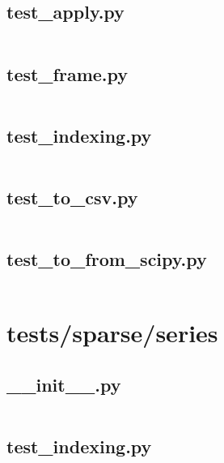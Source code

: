 \documentclass{article}
\begin{document}
\subsection{test\_apply.py}
\inputminted{python}{/home/dufferzafar/dev/@clones/pandas/pandas/tests/sparse/frame/test_apply.py}
\newpage

\subsection{test\_frame.py}
\inputminted{python}{/home/dufferzafar/dev/@clones/pandas/pandas/tests/sparse/frame/test_frame.py}
\newpage

\subsection{test\_indexing.py}
\inputminted{python}{/home/dufferzafar/dev/@clones/pandas/pandas/tests/sparse/frame/test_indexing.py}
\newpage

\subsection{test\_to\_csv.py}
\inputminted{python}{/home/dufferzafar/dev/@clones/pandas/pandas/tests/sparse/frame/test_to_csv.py}
\newpage

\subsection{test\_to\_from\_scipy.py}
\inputminted{python}{/home/dufferzafar/dev/@clones/pandas/pandas/tests/sparse/frame/test_to_from_scipy.py}
\newpage

\section{tests/sparse/series}

\subsection{\_\_init\_\_.py}
\inputminted{python}{/home/dufferzafar/dev/@clones/pandas/pandas/tests/sparse/series/__init__.py}
\newpage

\subsection{test\_indexing.py}
\inputminted{python}{/home/dufferzafar/dev/@clones/pandas/pandas/tests/sparse/series/test_indexing.py}
\newpage
\end{document}
